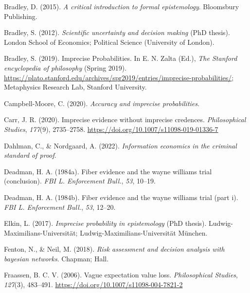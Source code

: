 \documentclass[
  10pt,
  dvipsnames,enabledeprecatedfontcommands]{scrartcl}
\newlength{\cslhangindent}
\newlength{\cslentryspacingunit} %
\newenvironment{CSLReferences}[2] %
 {%
  \setlength{\parindent}{0pt}
  \ifodd #1
  \let\oldpar\par
  \def\par{\hangindent=\cslhangindent\oldpar}
  \fi
  \setlength{\parskip}{#2\cslentryspacingunit}
 }%
 {}
\begin{document}
\hypertarget{refs}{}
\begin{CSLReferences}{1}{0}
\leavevmode{}%
Bradley, D. (2015). \emph{A critical introduction to formal
epistemology}. Bloomsbury Publishing.

\leavevmode{}%
Bradley, S. (2012). \emph{Scientific uncertainty and decision making}
(PhD thesis). London School of Economics; Political Science (University
of London).

\leavevmode{}%
Bradley, S. (2019). {Imprecise Probabilities}. In E. N. Zalta (Ed.),
\emph{The {Stanford} encyclopedia of philosophy} ({S}pring 2019).
\url{https://plato.stanford.edu/archives/spr2019/entries/imprecise-probabilities/};
Metaphysics Research Lab, Stanford University.

\leavevmode{}%
Campbell-Moore, C. (2020). \emph{Accuracy and imprecise probabilities}.

\leavevmode{}%
Carr, J. R. (2020). Imprecise evidence without imprecise credences.
\emph{Philosophical Studies}, \emph{177}(9), 2735--2758.
\url{https://doi.org/10.1007/s11098-019-01336-7}

\leavevmode{}%
Dahlman, C., \& Nordgaard, A. (2022). \emph{Information economics in the
criminal standard of proof}.

\leavevmode{}%
Deadman, H. A. (1984a). Fiber evidence and the wayne williams trial
(conclusion). \emph{FBI L. Enforcement Bull.}, \emph{53}, 10--19.

\leavevmode{}%
Deadman, H. A. (1984b). Fiber evidence and the wayne williams trial
(part i). \emph{FBI L. Enforcement Bull.}, \emph{53}, 12--20.

\leavevmode{}%
Elkin, L. (2017). \emph{Imprecise probability in epistemology} (PhD
thesis). Ludwig-Maximilians-Universit{ä}t;
Ludwig-Maximilians-Universität München.

\leavevmode{}%
Fenton, N., \& Neil, M. (2018). \emph{Risk assessment and decision
analysis with bayesian networks}. Chapman; Hall.

\leavevmode{}%
Fraassen, B. C. V. (2006). Vague expectation value loss.
\emph{Philosophical Studies}, \emph{127}(3), 483--491.
\url{https://doi.org/10.1007/s11098-004-7821-2}


\end{CSLReferences}
\end{document}
